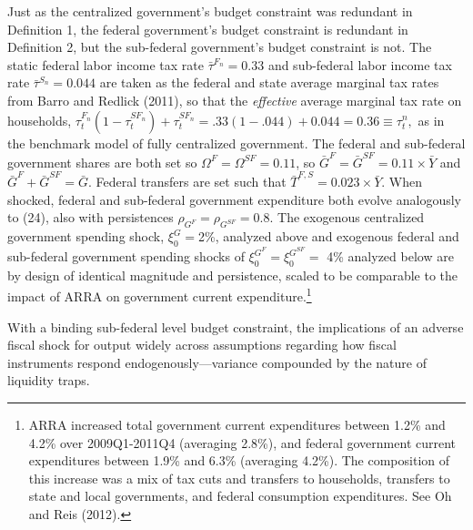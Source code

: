 \documentclass[12pt,letterpaper]{article}
\begin{document}
Just as the centralized government's budget constraint was redundant in Definition 1, the federal government's budget constraint is redundant in Definition 2, but the sub-federal government's budget constraint is not. The static federal labor income tax rate $\bar{\tau}^{F_n} = 0.33$ and sub-federal labor income tax rate $\bar{\tau}^{S_n} = 0.044$ are taken as the federal and state average marginal tax rates from Barro and Redlick (2011), so that the \textit{effective} average marginal tax rate  on households, 
$ \tau^{F_n}_t (1 - \tau^{{SF}_n}_t) + \tau^{{SF}_n}_t = .33(1-.044) + 0.044 = 0.36 \equiv \tau_t^n,
$ as in the benchmark model of fully centralized government. The federal and sub-federal government shares are both set so $\Omega^F = \Omega^{SF} = 0.11$, so $\bar{G}^F = \bar{G}^{SF} = 0.11 \times \bar{Y}$ and $\bar{G}^F + \bar{G}^{SF} = \bar{G}$. Federal transfers are set such that $\bar{T}^{F,S} = 0.023 \times \bar{Y} $. When shocked, federal and sub-federal government expenditure both evolve analogously to (24), also with persistences $\rho_{G^F} = \rho_{G^{SF}} = 0.8$. The exogenous centralized government spending shock, $\xi_0^G = $2\%, analyzed above and exogenous federal and sub-federal government spending shocks of $\xi_0^{G^F} = \xi_0^{G^{SF}} =$ 4\% analyzed below are by design of identical magnitude and persistence, scaled to be comparable to the impact of ARRA on government current expenditure.\footnote{ ARRA increased total government current expenditures between 1.2\% and 4.2\% over 2009Q1-2011Q4 (averaging 2.8\%), and federal government current expenditures between 1.9\% and 6.3\% (averaging 4.2\%). The composition of this increase was a mix of tax cuts and transfers to households, transfers to state and local governments, and federal consumption expenditures. See Oh and Reis (2012).}

With a binding sub-federal level budget constraint, the implications of an adverse fiscal shock for output widely across assumptions regarding how fiscal instruments respond endogenously---variance compounded by the nature of liquidity traps.
\end{document}

